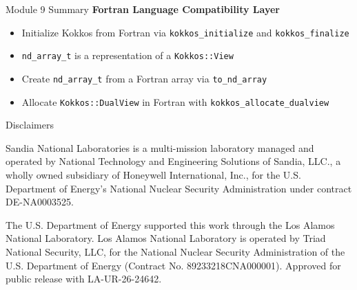 

\begin{frame}{Module 9 Summary}
\textbf{Fortran Language Compatibility Layer}
\begin{itemize}
  \item Initialize Kokkos from Fortran via \texttt{kokkos\_initialize} and \texttt{kokkos\_finalize}
  \item \texttt{nd\_array\_t} is a representation of a \texttt{Kokkos::View}
  \item Create \texttt{nd\_array\_t} from a Fortran array via \texttt{to\_nd\_array}
  \item Allocate \texttt{Kokkos::DualView} in Fortran with \texttt{kokkos\_allocate\_dualview}
\end{itemize}
\end{frame}

\begin{frame}{Disclaimers}

\begin{block}{}\small
Sandia National Laboratories is a multi-mission laboratory managed and operated by National Technology and Engineering Solutions of Sandia, LLC., a wholly owned subsidiary of Honeywell International, Inc., for the U.S. Department of Energy’s National Nuclear Security Administration under contract DE-NA0003525.\newline
\sandid
\end{block}

\begin{block}{}
The U.S. Department of Energy supported this work through the Los Alamos National Laboratory. Los Alamos National Laboratory is operated by Triad National Security, LLC, for the National Nuclear Security Administration of the U.S. Department of Energy (Contract No. 89233218CNA000001). Approved for public release with LA-UR-26-24642. 
\end{block}

\end{frame}


